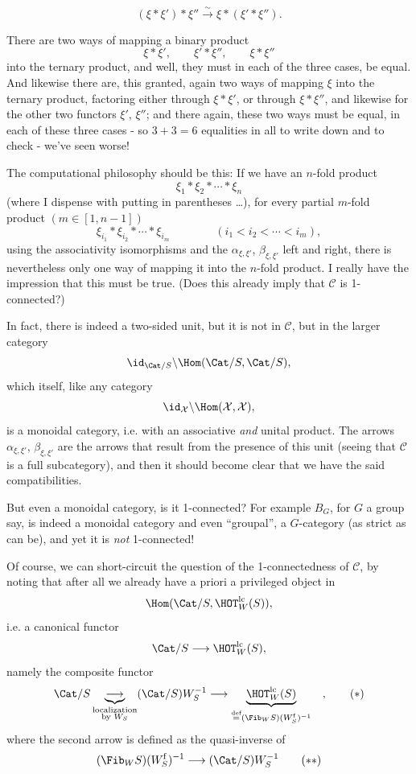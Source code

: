 \[
(\xi * \xi') * \xi'' \xrightarrow{\sim} \xi * (\xi' * \xi'').
\]

There are two ways of mapping a binary product
\[
\xi * \xi', \qquad \xi' * \xi'', \qquad \xi * \xi''
\]
into the ternary product, and well, they must in each of the three cases, be equal. And likewise there are, this granted, again two ways of mapping $\xi$ into the ternary product, factoring either through $\xi * \xi'$, or through $\xi * \xi''$, and likewise for the other two functors $\xi'$, $\xi''$; and there again, these two ways must be equal, in each of these three cases - so $3 + 3 = 6$ equalities in all to write down and to check - we've seen worse!

The computational philosophy should be this: If we have an $n$-fold product
\[
\xi_1 * \xi_2 * \cdots * \xi_n
\]
(where I dispense with putting in parentheses \dots), for every partial $m$-fold product $(m \in [1, n-1])$
\[
\xi_{i_1} * \xi_{i_2} * \cdots * \xi_{i_m} \qquad\qquad (i_1 < i_2 < \cdots < i_m),
\]
using the associativity isomorphisms and the $\alpha_{\xi,\xi'}$, $\beta_{\xi,\xi'}$ left and right, there is nevertheless only one way of mapping it into the $n$-fold product. I really have the impression that this must be true. (Does this already imply that $\mathcal{C}$ is 1-connected?)

In fact, there is indeed a two-sided unit, but it is not in $\mathcal{C}$, but in the larger category
\[
\id_{\Cat/S}\backslash\Hom(\Cat/S, \Cat/S),
\]
which itself, like any category
\[
\id_{\mathcal{X}}\backslash\Hom(\mathcal{X}, \mathcal{X}),
\]
is a monoidal category, i.e. with an associative \textit{and} unital product. The arrows $\alpha_{\xi,\xi'}$, $\beta_{\xi,\xi'}$ are the arrows that result from the presence of this unit (seeing that $\mathcal{C}$ is a full subcategory), and then it should become clear that we have the said compatibilities.

But even a monoidal category, is it 1-connected? For example $B_G$, for $G$ a group say, is indeed a monoidal category and even ``groupal'', a $G$-category (as strict as can be), and yet it is \textit{not} 1-connected!

Of course, we can short-circuit the question of the 1-connectedness of $\mathcal{C}$, by noting that after all we already have a priori a privileged object in
\[
\Hom(\Cat/S, \HOT^{\mathrm{lc}}_W(S)),
\]
i.e. a canonical functor
\[
\Cat/S \longrightarrow \HOT^{\mathrm{lc}}_W(S),
\]
namely the composite functor
\[
\Cat/S \underbrace{\longrightarrow}_{\substack{\text{localization}\\ \text{by } W_S}} (\Cat/S)W_S^{-1} \longrightarrow \underbrace{\HOT^{\mathrm{lc}}_W(S)}_{\overset{\text{def}}{=} (\Fib_W S)(W^{\mathrm{f}}_S)^{-1}} \quad ,
\tag*{$(*)$}
\]
where the second arrow is defined as the quasi-inverse of
\[
(\Fib_W S)(W^{\mathrm{f}}_S)^{-1} \longrightarrow (\Cat/S)W_S^{-1}
\tag*{$(**)$}
\]


